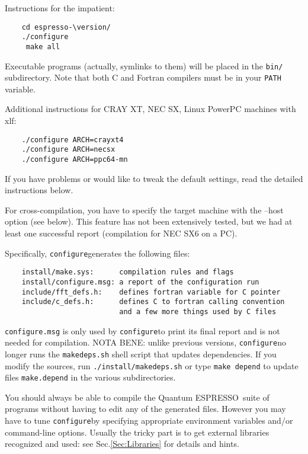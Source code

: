 \documentclass[12pt,a4paper]{article}
\def\version{4.2.0}
\def\qe{{\sc Quantum ESPRESSO}}
\def\configure{\texttt{configure}}
\begin{document}
Instructions for the impatient:
\begin{verbatim}
    cd espresso-\version/
    ./configure
     make all
\end{verbatim}
Executable programs (actually, symlinks to them) will be placed in the
\texttt{bin/}
subdirectory. Note that both C and Fortran compilers must be in your \texttt{PATH} variable.

Additional instructions for CRAY XT, NEC SX, Linux PowerPC machines with
xlf:
\begin{verbatim}
    ./configure ARCH=crayxt4
    ./configure ARCH=necsx
    ./configure ARCH=ppc64-mn
\end{verbatim}
If you have problems or would like to tweak the default settings, read the
detailed instructions below.
    
For cross-compilation, you have to specify the target machine with the
--host option (see below). This feature has not been extensively
tested, but we had at least one successful report (compilation for NEC
SX6 on a PC). 
    
Specifically, \configure generates the following files:
\begin{verbatim}
    install/make.sys:      compilation rules and flags
    install/configure.msg: a report of the configuration run
    include/fft_defs.h:    defines fortran variable for C pointer
    include/c_defs.h:      defines C to fortran calling convention
                           and a few more things used by C files
\end{verbatim}
\texttt{configure.msg} is only used by \configure to print its final 
report and is not needed for compilation. NOTA BENE: unlike previous
versions, \configure no longer runs the \texttt{makedeps.sh} 
shell script that updates dependencies. If you modify the  
sources, run \texttt{./install/makedeps.sh} or type \texttt{make depend}
to update files \texttt{make.depend} in the various subdirectories.
    
You should always be able to compile the \qe\ suite
of programs without having to edit any of the generated files. However you
may have to tune \configure by specifying appropriate environment variables
and/or command-line options. Usually the tricky part is to get external
libraries recognized and used: see Sec.\ref{Sec:Libraries}
for details and hints.
\end{document}
